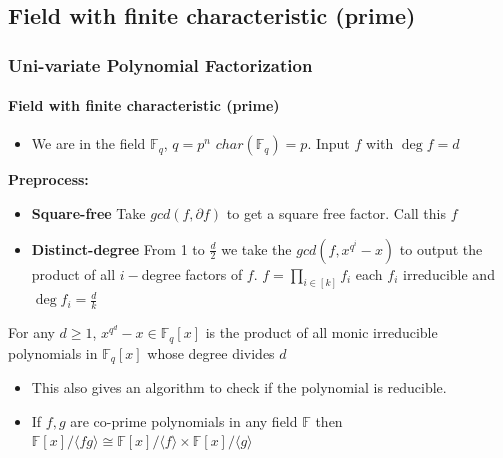 \documentclass[10pt]{beamer}
\begin{document}
\subsection{Field with finite characteristic (prime)}
\begin{frame}[allowframebreaks]
\frametitle{Uni-variate Polynomial Factorization}
\framesubtitle{Field with finite characteristic (prime)}
\begin{itemize}
	\item We are in the field $\mathbb{F}_q$, $q=p^n$ $char(\mathbb{F}_q)=p$. Input $f$ with $\deg f=d$
\end{itemize}
{\textbf{Preprocess:}}
\begin{itemize}
	\item \textbf{Square-free} Take $gcd(f,\partial f)$ to get a square free factor. Call this $f$
	\item \textbf{Distinct-degree} From 1 to $\frac{d}{2}$ we take the $gcd(f,x^{q^i}-x)$ to output the product of all $i-$degree factors of $f$. $f=\prod\limits_{i\in [k]}f_i$ each $f_i$ irreducible and $\deg f_i=\frac{d}{k}$
\end{itemize}
	
	\begin{theorem}
		For any $d\geq 1$, $x^{q^d}-x\in \mathbb{F}_q[x]$ is the product of all monic irreducible polynomials in $\mathbb{F}_q[x] $ whose degree divides $d$
	\end{theorem}
	\begin{itemize}
		\item This also gives an algorithm to check if the polynomial is reducible.
		\item If $f,g$ are co-prime polynomials in any field $\mathbb{F}$ then $\mathbb{F}[x]/\langle fg\rangle\cong \mathbb{F}[x]/\langle f\rangle\times \mathbb{F}[x]/\langle g\rangle$
	\end{itemize}
	\vspace*{5mm}
	

\end{frame}
\end{document}
